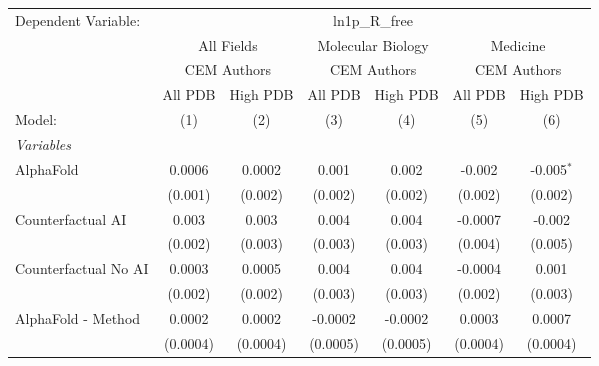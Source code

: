 \begingroup
\centering
\begin{tabular}{lcccccc}
   \tabularnewline \midrule \midrule
   Dependent Variable: & \multicolumn{6}{c}{ln1p\_R\_free}\\
 & \multicolumn{2}{c}{All Fields} & \multicolumn{2}{c}{Molecular Biology} & \multicolumn{2}{c}{Medicine} \\
\cmidrule(lr){2-3} \cmidrule(lr){4-5} \cmidrule(lr){6-7}
 & \multicolumn{2}{c}{CEM Authors} & \multicolumn{2}{c}{CEM Authors} & \multicolumn{2}{c}{CEM Authors} \\
\cmidrule(lr){2-3} \cmidrule(lr){4-5} \cmidrule(lr){6-7}
 & \multicolumn{1}{c}{All PDB} & \multicolumn{1}{c}{High PDB} & \multicolumn{1}{c}{All PDB} & \multicolumn{1}{c}{High PDB} & \multicolumn{1}{c}{All PDB} & \multicolumn{1}{c}{High PDB} \\
\cmidrule(lr){2-2} \cmidrule(lr){3-3} \cmidrule(lr){4-4} \cmidrule(lr){5-5} \cmidrule(lr){6-6} \cmidrule(lr){7-7}
   Model:                                                     & (1)             & (2)       & (3)       & (4)       & (5)            & (6)\\  
   \midrule
   \emph{Variables}\\
   AlphaFold                                                  & 0.0006          & 0.0002    & 0.001     & 0.002     & -0.002         & -0.005$^{*}$\\   
                                                              & (0.001)         & (0.002)   & (0.002)   & (0.002)   & (0.002)        & (0.002)\\   
   Counterfactual AI                                          & 0.003           & 0.003     & 0.004     & 0.004     & -0.0007        & -0.002\\   
                                                              & (0.002)         & (0.003)   & (0.003)   & (0.003)   & (0.004)        & (0.005)\\   
   Counterfactual No AI                                       & 0.0003          & 0.0005    & 0.004     & 0.004     & -0.0004        & 0.001\\   
                                                              & (0.002)         & (0.002)   & (0.003)   & (0.003)   & (0.002)        & (0.003)\\   
   AlphaFold - Method                                         & 0.0002          & 0.0002    & -0.0002   & -0.0002   & 0.0003         & 0.0007\\   
                                                              & (0.0004)        & (0.0004)  & (0.0005)  & (0.0005)  & (0.0004)       & (0.0004)\\   

\end{tabular}
